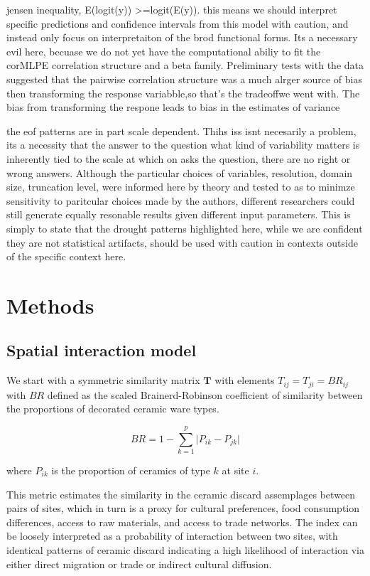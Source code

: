 \documentclass[fleqn,10pt]{wlscirep}
\begin{document}
jensen inequality, E(logit(y)) >=logit(E(y)). this means we should interpret specific predictions and confidence intervals from this model with caution, and instead only focus on interpretaiton of the brod functional forms. Its a necessary evil here, becuase we do not yet have the computational abiliy to fit the corMLPE correlation structure and a beta family. Preliminary tests with the data suggested that the pairwise correlation structure was a much alrger source of bias then transforming the response variabble,so that's the tradeoffwe went with. The bias from transforming the respone leads to bias in the estimates of variance

the eof patterns are in part scale dependent. Thihs iss isnt necesarily a problem, its a necessity that the answer to the question what kind of variability matters is inherently tied to the scale at which on asks the question, there are no right or wrong answers. Although the particular choices of variables, resolution, domain size, truncation level, were informed here by theory and tested to as to minimze sensitivity to paritcular choices made by the authors, different researchers could still generate equally resonable results given  different input parameters.  This is simply to state that the drought patterns highlighted here, while we are confident they are not statistical artifacts, should be used with caution in contexts outside of the specific context here.

\section*{Methods}


\subsection*{Spatial interaction model}

We start with a symmetric similarity matrix $\mathbf{T}$ with elements $T_{ij} = T_{ji} = BR_{ij}$ with $BR$ defined as the scaled Brainerd-Robinson coefficient of similarity between the proportions of decorated ceramic ware types.

$$BR = 1 - \sum_{k=1}^{p} \lvert P_{ik} - P_{jk} \rvert$$

where $P_{ik}$ is the proportion of ceramics of type $k$ at site $i$.

This metric estimates the similarity in the ceramic discard assemplages between pairs of sites, which in turn is a proxy for cultural preferences, food consumption differences, access to raw materials, and access to trade networks. The index can be loosely interpreted as a probability of interaction between two sites, with identical patterns of ceramic discard indicating a high likelihood of interaction via either direct migration or trade or indirect cultural diffusion.
\end{document}
